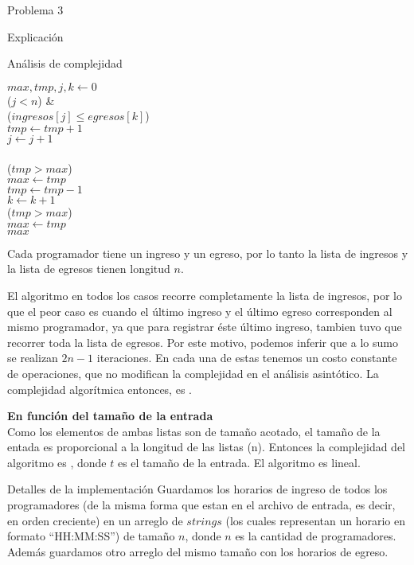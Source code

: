 \begin{section}{Problema 3}
\begin{subsection}{Explicación}
\begin{subsubsection}{Análisis de complejidad}
			\begin{pseudo}
				\tab $max,tmp,j,k \leftarrow 0$ \\
				\tab \WHILE($j< n$) &   \\
				\tab \tab \IF($ingresos[j]\leq egresos[k]$) \\
				\tab \tab \tab $tmp \leftarrow tmp+1$ \\
				\tab \tab \tab $j \leftarrow j+1$ \\
				\tab \tab \ELSE \\
				\tab \tab \tab \IF($tmp>max$) \\
				\tab \tab \tab \tab $max \leftarrow tmp$ \\
				\tab \tab \tab $tmp \leftarrow tmp - 1$ \\
				\tab \tab \tab $k \leftarrow k+1$ \\
				\tab \IF($tmp>max$) \\
				\tab \tab $max \leftarrow tmp$ \\
				\tab \RET $max$
			\end{pseudo}

			Cada programador tiene un ingreso y un egreso, por lo tanto la lista de ingresos y la lista de egresos tienen longitud $n$.

El algoritmo en todos los casos recorre completamente la lista de ingresos, por lo que el peor caso es cuando el último ingreso y el último egreso corresponden al mismo programador, ya que para registrar éste último ingreso, tambien tuvo que recorrer toda la lista de egresos. Por este motivo, podemos inferir que a lo sumo se realizan $2n -1$ iteraciones. En cada una de estas tenemos un costo constante de operaciones, que no modifican la complejidad en el análisis asintótico. La complejidad algorítmica entonces, es .\VSP

		\noindent\textbf{En función del tamaño de la entrada}\\

			Como los elementos de ambas listas son de tamaño acotado, el tamaño de la entada es proporcional a la longitud de las listas (n). Entonces la complejidad del algoritmo es , donde $t$ es el tamaño de la entrada. El algoritmo es lineal.

		\end{subsubsection}

	\end{subsection}

	\begin{subsection}{Detalles de la implementación}
	Guardamos los horarios de ingreso de todos los programadores (de la misma forma que estan en el archivo de entrada, es decir, en orden creciente) en un arreglo de $strings$ (los cuales representan un horario en formato ``HH:MM:SS'') de tamaño $n$, donde $n$ es la cantidad de programadores. Además guardamos otro arreglo del mismo tamaño con los horarios de egreso.
	

\end{subsection}
\end{section}
